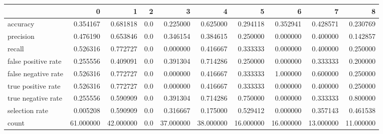 \begin{tabular}{lrrrrrrrrr}
\toprule
{} &          0 &          1 &    2 &          3 &          4 &          5 &          6 &          7 &          8 \\
\midrule
accuracy            &   0.354167 &   0.681818 &  0.0 &   0.225000 &   0.625000 &   0.294118 &   0.352941 &   0.428571 &   0.230769 \\
precision           &   0.476190 &   0.653846 &  0.0 &   0.346154 &   0.384615 &   0.250000 &   0.000000 &   0.400000 &   0.142857 \\
recall              &   0.526316 &   0.772727 &  0.0 &   0.000000 &   0.416667 &   0.333333 &   0.000000 &   0.400000 &   0.250000 \\
false positive rate &   0.255556 &   0.409091 &  0.0 &   0.391304 &   0.714286 &   0.250000 &   0.000000 &   0.333333 &   0.200000 \\
false negative rate &   0.526316 &   0.772727 &  0.0 &   0.000000 &   0.416667 &   0.333333 &   1.000000 &   0.600000 &   0.250000 \\
true positive rate  &   0.526316 &   0.772727 &  0.0 &   0.000000 &   0.416667 &   0.333333 &   0.000000 &   0.400000 &   0.250000 \\
true negative rate  &   0.255556 &   0.590909 &  0.0 &   0.391304 &   0.714286 &   0.750000 &   0.000000 &   0.333333 &   0.800000 \\
selection rate      &   0.005208 &   0.590909 &  0.0 &   0.316667 &   0.175000 &   0.529412 &   0.000000 &   0.357143 &   0.461538 \\
count               &  61.000000 &  42.000000 &  0.0 &  37.000000 &  38.000000 &  16.000000 &  16.000000 &  13.000000 &  11.000000 \\
\bottomrule
\end{tabular}
